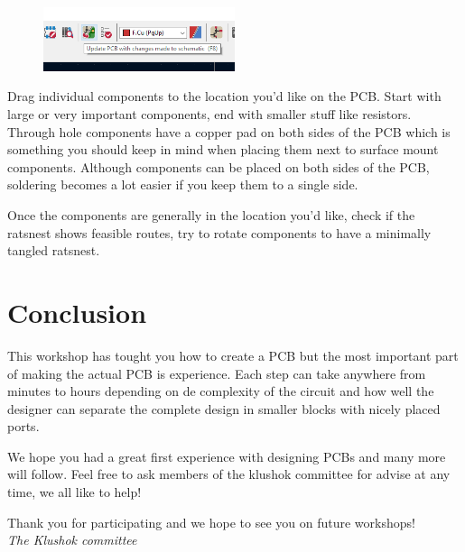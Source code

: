 \documentclass[12pt]{article}
\begin{document}
\begin{figure}[h]
	\centering
	\includegraphics[width=0.5\textwidth]{../images/update_PCB.png}
	\caption{}
	\label{fig:update_pcb}
\end{figure}

Drag individual components to the location you'd like on the PCB. Start with large or very important components, end with smaller stuff like resistors. Through hole components have a copper pad on both sides of the PCB which is something you should keep in mind when placing them next to surface mount components.
Although components can be placed on both sides of the PCB, soldering becomes a lot easier if you keep them to a single side.

Once the components are generally in the location you'd like, check if the ratsnest shows feasible routes, try to rotate components to have a minimally tangled ratsnest.




\section{Conclusion}
This workshop has tought you how to create a PCB but the most important part of making the actual PCB is experience. Each step can take anywhere from minutes to hours depending on de complexity of the circuit and how well the designer can separate the complete design in smaller blocks with nicely placed ports.

We hope you had a great first experience with designing PCBs and many more will follow. Feel free to ask members of the klushok committee for advise at any time, we all like to help!

Thank you for participating and we hope to see you on future workshops!\\
\vspace{3ex}
\textit{The Klushok committee}
\end{document}
